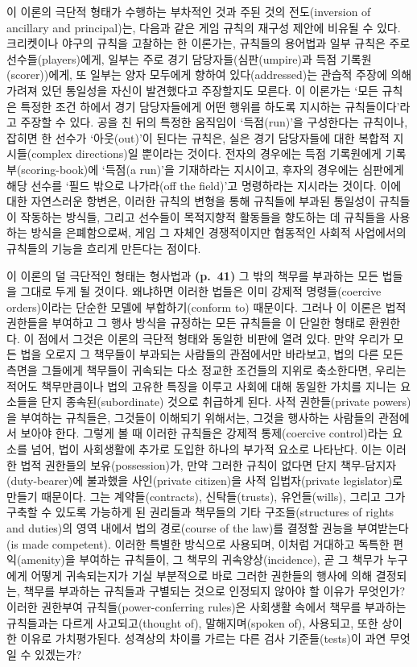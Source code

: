 이 이론의 극단적 형태가 수행하는 부차적인 것과 주된 것의 전도(inversion
of ancillary and principal)는, 다음과 같은 게임 규칙의 재구성 제안에
비유될 수 있다. 크리켓이나 야구의 규칙을 고찰하는 한 이론가는, 규칙들의
용어법과 일부 규칙은 주로 선수들(players)에게, 일부는 주로 경기
담당자들(심판(umpire)과 득점 기록원(scorer))에게, 또 일부는 양자
모두에게 향하여 있다(addressed)는 관습적 주장에 의해 가려져 있던
통일성을 자신이 발견했다고 주장할지도 모른다. 이 이론가는 ‘모든 규칙은
 특정한 조건 하에서 경기 담당자들에게 어떤 행위를
하도록 지시하는 규칙들이다’라고 주장할 수 있다. 공을 친 뒤의 특정한
움직임이 ‘득점(run)’을 구성한다는 규칙이나, 잡히면 한 선수가
‘아웃(out)’이 된다는 규칙은, 실은 경기 담당자들에 대한 복합적
지시들(complex directions)일 뿐이라는 것이다. 전자의 경우에는 득점
기록원에게 기록부(scoring-book)에 ‘득점(a run)’을 기재하라는 지시이고,
후자의 경우에는 심판에게 해당 선수를 ‘필드 밖으로 나가라(off the
field)’고 명령하라는 지시라는 것이다. 이에 대한 자연스러운 항변은,
이러한 규칙의 변형을 통해 규칙들에 부과된 통일성이 규칙들이 작동하는
방식들, 그리고 선수들이 목적지향적 활동들을 향도하는 데 규칙들을
사용하는 방식을 은폐함으로써, 게임 그 자체인 경쟁적이지만 협동적인
사회적 사업에서의 규칙들의 기능을 흐리게 만든다는 점이다.

이 이론의 덜 극단적인 형태는 형사법과 \textbf{(p.~41)} 그 밖의 책무를
부과하는 모든 법들을 그대로 두게 될 것이다. 왜냐하면 이러한 법들은 이미
강제적 명령들(coercive orders)이라는 단순한 모델에 부합하기(conform to)
때문이다. 그러나 이 이론은 법적 권한들을 부여하고 그 행사 방식을
규정하는 모든 규칙들을 이 단일한 형태로 환원한다. 이 점에서 그것은
이론의 극단적 형태와 동일한 비판에 열려 있다. 만약 우리가 모든 법을
오로지 그 책무들이 부과되는 사람들의 관점에서만 바라보고, 법의 다른 모든
측면을 그들에게 책무들이 귀속되는 다소 정교한 조건들의 지위로
축소한다면, 우리는 적어도 책무만큼이나 법의 고유한 특징을 이루고 사회에
대해 동일한 가치를 지니는 요소들을 단지 종속된(subordinate) 것으로
취급하게 된다. 사적 권한들(private powers)을 부여하는 규칙들은, 그것들이
이해되기 위해서는, 그것을 행사하는 사람들의 관점에서 보아야 한다. 그렇게
볼 때 이러한 규칙들은 강제적 통제(coercive control)라는 요소를 넘어,
법이 사회생활에 추가로 도입한 하나의 부가적 요소로 나타난다. 이는 이러한
법적 권한들의 보유(possession)가, 만약 그러한 규칙이 없다면 단지
책무-담지자(duty-bearer)에 불과했을 사인(private citizen)을 사적
입법자(private legislator)로 만들기 때문이다. 그는 계약들(contracts),
신탁들(trusts), 유언들(wills), 그리고 그가 구축할 수 있도록 가능하게 된
권리들과 책무들의 기타 구조들(structures of rights and duties)의 영역
내에서 법의 경로(course of the law)를 결정할 권능을 부여받는다(is made
competent). 이러한 특별한 방식으로 사용되며, 이처럼 거대하고 독특한
편익(amenity)을 부여하는 규칙들이, 그 책무의 귀속양상(incidence), 곧 그
책무가 누구에게 어떻게 귀속되는지가 기실 부분적으로 바로 그러한 권한들의
행사에 의해 결정되는, 책무를 부과하는 규칙들과 구별되는 것으로 인정되지
않아야 할 이유가 무엇인가? 이러한 권한부여 규칙들(power-conferring
rules)은 사회생활 속에서 책무를 부과하는 규칙들과는 다르게
사고되고(thought of), 말해지며(spoken of), 사용되고, 또한 상이한 이유로
가치평가된다. 성격상의 차이를 가르는 다른 검사 기준들(tests)이 과연
무엇일 수 있겠는가?

